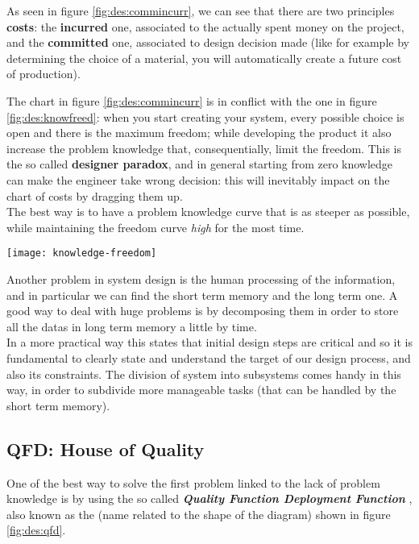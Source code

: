 	As seen in figure \ref{fig:des:commincurr}, we can see that there are two principles \textbf{costs}: the \textbf{incurred} one, associated to the actually spent money on the project, and the \textbf{committed} one, associated to design decision made (like for example by determining the choice of a material, you will automatically create a future cost of production).
	
	The chart in figure \ref{fig:des:commincurr} is in conflict with the one in figure \ref{fig:des:knowfreed}: when you start creating your system, every possible choice is open and there is the maximum freedom; while developing the product it also increase the problem knowledge that, consequentially, limit the freedom. This is the so called \textbf{designer paradox}, and in general starting from zero knowledge can make the engineer take wrong decision: this will inevitably impact on the chart of costs by dragging them up. \\
	The best way is to have a problem knowledge curve that is as steeper as possible, while maintaining the freedom curve \textit{high} for the most time.
			
	\begin{SCfigure}[1][bht]
		\centering
		\texttt{[image: knowledge-freedom]}
		\caption{design freedom and problem knowledge while designing a system.}
		\label{fig:des:knowfreed}
	\end{SCfigure}

	Another problem in system design is the human processing of the information, and in particular we can find the short term memory and the long term one. A good way to deal with huge problems is by decomposing them in order to store all the datas in long term memory a little by time.\\
	In a more practical way this states that initial design steps are critical and so it is fundamental to clearly state and understand the target of our design process, and also its constraints. The division of system into subsystems comes handy in this way, in order to subdivide more manageable tasks (that can be handled by the short term memory).
	
	\subsection{QFD: House of Quality}
		One of the best way to solve the first problem linked to the lack of problem knowledge is by using the so called \textbf{\textit{Quality Function Deployment Function}} , also known as the  (name related to the shape of the diagram) shown in figure \ref{fig:des:qfd}.
	
